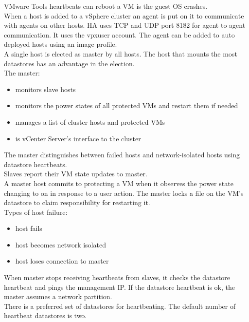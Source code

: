 VMware Tools heartbeats can reboot a VM is the guest OS crashes.\\

When a host is added to a vSphere cluster an agent is put on it to
communicate with agents on other hosts. HA uses TCP and UDP port 8182 for
agent to agent communication. It uses the vpxuser account. The agent can
be added to auto deployed hosts using an image profile.\\

A single host is elected as master by all hosts. The host that mounts the
most datastores has an advantage in the election.\\

The master:

\begin{itemize}
\item monitors slave hosts
\item monitors the power states of all protected VMs and restart them if needed
\item manages a list of cluster hosts and protected VMs
\item is vCenter Server's interface to the cluster
\end{itemize}

The master distinguishes between failed hosts and network-isolated hosts using
datastore heartbeats.\\

Slaves report their VM state updates to master.\\

A master host commits to protecting a VM when it observes the power state
changing to on in response to a user action. The master locks a file on the
VM's datastore to claim responsibility for restarting it.\\

Types of host failure:

\begin{itemize}
\item host fails
\item host becomes network isolated
\item host loses connection to master
\end{itemize}

When master stops receiving heartbeats from slaves, it checks the datastore
heartbeat and pings the management IP. If the datastore heartbeat is ok, the
master assumes a network partition.\\

There is a preferred set of datastores for heartbeating. The default number
of heartbeat datastores is two.\\

